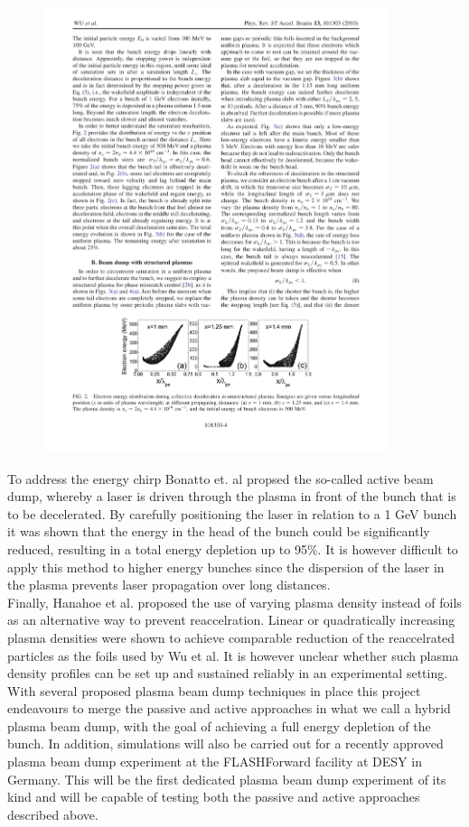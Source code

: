 \begin{figure}
\centering
\includegraphics[width=0.9\textwidth]{Wu_energy_uniform.pdf}
\caption{}
\label{Wu}
\end{figure}
To address the energy chirp Bonatto et. al propsed the so-called active beam dump, whereby a laser is driven through the plasma in front of the bunch that is to be decelerated. By carefully positioning the laser in relation to a 1 GeV bunch it was shown that the energy in the head of the bunch could be significantly reduced, resulting in a total energy depletion up to 95\%. It is however difficult to apply this method to higher energy bunches since the dispersion of the laser in the plasma prevents laser propagation over long distances. \\
Finally, Hanahoe et al. proposed the use of varying plasma density instead of foils as an alternative way to prevent reaccelration. Linear or quadratically increasing plasma densities were shown to achieve comparable reduction of the reaccelrated particles as the foils used by Wu et al.  It is however unclear whether such plasma density profiles can be set up and sustained reliably in an experimental setting. \\
With several proposed plasma beam dump techniques in place this project endeavours to merge the passive and active approaches in what we call a hybrid plasma beam dump, with the goal of achieving a full energy depletion of the bunch. In addition, simulations will also be carried out for a recently approved plasma beam dump experiment at the FLASHForward facility at DESY in Germany. This will be the first dedicated plasma beam dump experiment of its kind and will be capable of testing both the passive and active approaches described above. 
